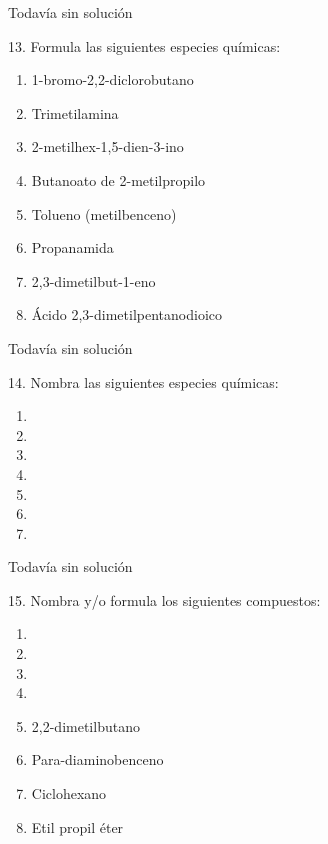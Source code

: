 \documentclass[twocolumn]{article}
\begin{document}
\begin{solution}[print=false]
  Todavía sin solución
\end{solution}

\begin{exercise}
  13. Formula las siguientes especies químicas:
  \begin{enumerate}
    \item 1-bromo-2,2-diclorobutano
    \item Trimetilamina
    \item 2-metilhex-1,5-dien-3-ino
    \item Butanoato de 2-metilpropilo
    \item Tolueno (metilbenceno)
    \item Propanamida
    \item 2,3-dimetilbut-1-eno
    \item Ácido 2,3-dimetilpentanodioico
  \end{enumerate}
\end{exercise}

\begin{solution}[print=false]
  Todavía sin solución
\end{solution}

\begin{exercise}
  14. Nombra las siguientes especies químicas:
  \begin{enumerate}
    \item {}
    \item {}
    \item {}
    \item {}
    \item {}
    \item {}
    \item {}
  \end{enumerate}
\end{exercise}

\begin{solution}[print=false]
  Todavía sin solución
\end{solution}

\begin{exercise}
  15. Nombra y/o formula los siguientes compuestos:
  \begin{enumerate}
    \item {}
    \item {}
    \item {}
    \item {}
    \item 2,2-dimetilbutano
    \item Para-diaminobenceno
    \item Ciclohexano
    \item Etil propil éter
  \end{enumerate}
\end{exercise}
\end{document}
